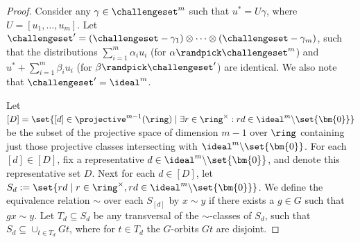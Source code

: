 \begin{proof}
Consider any $\gamma \in \challengeset^m$ such that $u^\ast = U \gamma$, where $U = [u_1,\dotsc,u_m]$. Let $\challengeset' = (\challengeset - \gamma_1) \otimes \dotsm \otimes (\challengeset - \gamma_m)$, such that the distributions $\sum_{i=1}^{m} \alpha_i u_i$ (for $\alpha \randpick \challengeset^m$) and $u^\ast + \sum_{i=1}^{m} \beta_i u_i$ (for $\beta \randpick \challengeset'$) are identical. We also note that $\challengeset' = \ideal^m$.

Let $[D] = \set{[d] \in \projective^{m-1}(\ring) \mid \exists r \in \ring^\times: rd \in \ideal^{m}{\setminus}\set{\bm{0}}}$ be the subset of the projective space of dimension $m-1$ over $\ring$ containing just those projective classes intersecting with $\ideal^{m}{\setminus}\set{\bm{0}}$. For each $[d] \in [D]$, fix a representative $d \in \ideal^{m}{\setminus}\set{\bm{0}}$, and denote this representative set $D$. Next for each $d \in [D]$, let $S_{d} := \set{rd \mid r \in \ring^\times, rd \in \ideal^{m}{\setminus}\set{\bm{0}}}$. We define the equivalence relation $\sim$ over each $S_{[d]}$ by $x \sim y$ if there exists a $g \in G$ such that $gx \sim y$.  Let $T_d \subseteq S_d$ be any transversal of the $\sim$-classes of $S_d$, such that $S_d \subseteq \cup_{t \in T_d} Gt$, where for $t \in T_d$ the $G$-orbits $Gt$ are disjoint.


\end{proof}

